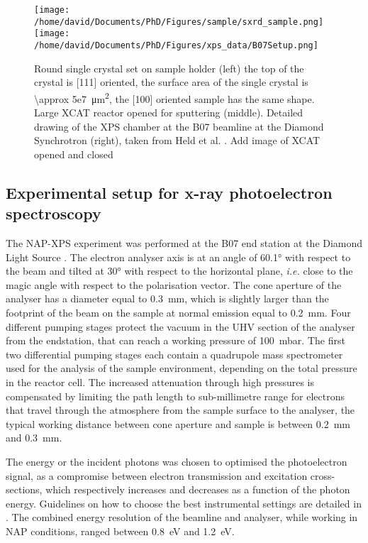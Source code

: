 \begin{figure}[!htb]
    \centering
    \texttt{[image: /home/david/Documents/PhD/Figures/sample/sxrd\_sample.png]}
    \texttt{[image: /home/david/Documents/PhD/Figures/xps\_data/B07Setup.png]}
    \caption{
        Round single crystal set on sample holder (left) the top of the crystal is [111] oriented, the surface area of the single crystal is \qty{\approx 5e7}{\um^2}, the [100] oriented sample has the same shape.
        Large XCAT reactor opened for sputtering (middle).
        Detailed drawing of the XPS chamber at the B07 beamline at the Diamond Synchrotron (right), taken from Held et al. \parencite*{Held2020}.
        \textcolor{Important}{Add image of XCAT opened and closed}
    }
    \label{fig:SampleSXRD}
\end{figure}

\subsection{Experimental setup for x-ray photoelectron spectroscopy} \label{sec:XPS111}

The NAP-XPS experiment was performed at the B07 end station at the Diamond Light Source \parencite{Held2020}.
The electron analyser axis is at an angle of \ang{60.1} with respect to the beam and tilted at \ang{30} with respect to the horizontal plane, \textit{i.e.} close to the magic angle with respect to the polarisation vector.
The cone aperture of the analyser has a diameter equal to \qty{0.3}{\mm}, which is slightly larger than the footprint of the beam on the sample at normal emission equal to \qty{0.2}{\mm}.
Four different pumping stages protect the vacuum in the UHV section of the analyser from the endstation, that can reach a working pressure of \qty{100}{\milli\bar}.
The ﬁrst two differential pumping stages each contain a quadrupole mass spectrometer used for the analysis of the sample environment, depending on the total pressure in the reactor cell.
The increased attenuation through high pressures is compensated by limiting the path length to sub-millimetre range for electrons that travel through the atmosphere from the sample surface to the analyser, the typical working distance between cone aperture and sample is between \qty{0.2}{\mm} and \qty{0.3}{\mm}.

The energy or the incident photons was chosen to optimised the photoelectron signal, as a compromise between electron transmission and excitation cross-sections, which respectively increases and decreases as a function of the photon energy.
Guidelines on how to choose the best instrumental settings are detailed in \parencite{Held2020}.
The combined energy resolution of the beamline and analyser, while working in NAP conditions, ranged between \qty{0.8}{\eV} and \qty{1.2}{\eV}.